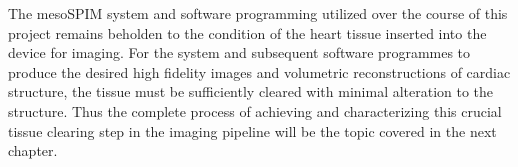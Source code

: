 The mesoSPIM system and software programming utilized over the course of this project remains beholden to the condition of the heart tissue inserted into the device for imaging. For the system and subsequent software programmes to produce the desired high fidelity images and volumetric reconstructions of cardiac structure, the tissue must be sufficiently cleared with minimal alteration to the structure. Thus the complete process of achieving and characterizing this crucial tissue clearing step in the imaging pipeline will be the topic covered in the next chapter. 
